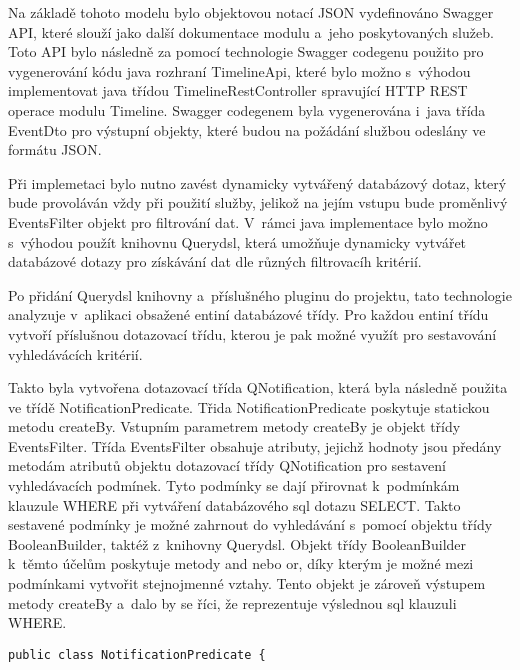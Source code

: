 \documentclass[12pt]{article}
\begin{document}
{\clearpage

\obrazek
{}

\clearpage

Na základě tohoto modelu bylo objektovou notací JSON vydefinováno Swagger API,
které slouží jako další dokumentace modulu a~jeho poskytovaných služeb.
Toto API bylo následně za pomocí technologie Swagger codegenu 
použito pro vygenerování kódu java rozhraní TimelineApi, 
které bylo možno s~výhodou implementovat java třídou TimelineRestController
spravující HTTP REST operace modulu Timeline.
Swagger codegenem byla vygenerována i~java třída EventDto pro výstupní objekty,
které budou na požádání službou odeslány ve formátu JSON.

Při implemetaci bylo nutno zavést dynamicky vytvářený databázový dotaz,
který bude provoláván vždy při použití služby,
jelikož na jejím vstupu bude proměnlivý EventsFilter objekt pro filtrování dat.
V~rámci java implementace bylo možno s~výhodou použít knihovnu Querydsl,
která umožňuje dynamicky vytvářet databázové dotazy 
pro získávání dat dle různých filtrovacíh kritérií.

Po přidání Querydsl knihovny a~příslušného pluginu do projektu, 
tato technologie analyzuje v~aplikaci obsažené entiní databázové třídy.
Pro každou entiní třídu vytvoří příslušnou dotazovací třídu,
kterou je pak možné využít pro sestavování vyhledávácích kritérií.

Takto byla vytvořena dotazovací třída QNotification,
která byla následně použita ve třídě NotificationPredicate.
Třida NotificationPredicate poskytuje statickou metodu createBy.
Vstupním parametrem metody createBy je objekt třídy EventsFilter. 
Třída EventsFilter obsahuje atributy, jejichž hodnoty jsou předány metodám atributů objektu
dotazovací třídy QNotification pro sestavení vyhledávacích podmínek.
Tyto podmínky se dají přirovnat k~podmínkám klauzule WHERE při vytváření databázového sql dotazu SELECT.
Takto sestavené podmínky je možné zahrnout do vyhledávání s~pomocí objektu třídy BooleanBuilder, taktéž z~knihovny Querydsl.
Objekt třídy BooleanBuilder k~těmto účelům poskytuje metody and nebo or, 
díky kterým je možné mezi podmínkami vytvořit stejnojmenné vztahy.
Tento objekt je zároveň výstupem metody createBy a~dalo by se říci, že reprezentuje výslednou sql klauzuli WHERE.

\clearpage

\begin{lstlisting}
public class NotificationPredicate {


\end{lstlisting}}
\end{document}
